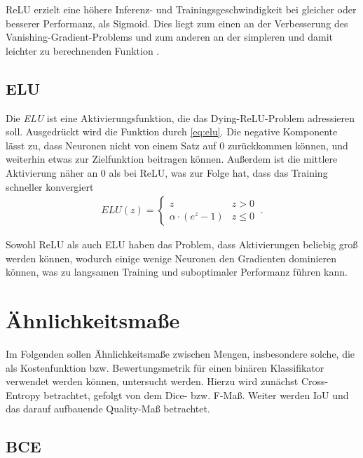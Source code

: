 \ac{ReLU} erzielt eine höhere Inferenz- und Trainingsgeschwindigkeit bei gleicher oder besserer Performanz, 
als Sigmoid. Dies liegt zum einen an der Verbesserung des Vanishing-Gradient-Problems und zum anderen an der 
simpleren und damit leichter zu berechnenden Funktion \cite{Goodfellow.2016}.

\subsection{\acf{ELU}} \label{sec:activation:elu}

Die \textit{\acf{ELU}} ist eine Aktivierungsfunktion, die das Dying-\ac{ReLU}-Problem adressieren soll. 
Ausgedrückt wird die Funktion durch \autoref{eq:elu}. Die negative Komponente lässt zu, dass Neuronen nicht 
von einem Satz auf $0$ zurückkommen können, und weiterhin etwas zur Zielfunktion beitragen können. Außerdem ist die mittlere 
Aktivierung näher an $0$ als bei \ac{ReLU}, was zur Folge hat, dass das Training schneller konvergiert \cite{Clevert.23112015}
\begin{align}
	\label{eq:elu} ELU(z) = \begin{cases} 
		z & z > 0 \\
		\alpha \cdot (e^z - 1) & z \leq 0 
	\end{cases} ~.
\end{align}

Sowohl \ac{ReLU} als auch \ac{ELU} haben das Problem, dass Aktivierungen beliebig groß werden können, 
wodurch einige wenige Neuronen den Gradienten dominieren können, was zu langsamen Training und suboptimaler Performanz führen kann. 


\section{Ähnlichkeitsmaße} \label{sec:evaluation-metrics}

Im Folgenden sollen Ähnlichkeitsmaße zwischen Mengen, insbesondere 
solche, die als Kostenfunktion bzw. Bewertungsmetrik für einen binären 
Klassifikator verwendet werden können, untersucht werden. Hierzu wird zunächst Cross-Entropy betrachtet,
gefolgt von dem Dice- bzw. F-Maß. Weiter werden \ac{IoU} und das darauf aufbauende Quality-Maß betrachtet.

\subsection{\acf{BCE}}

